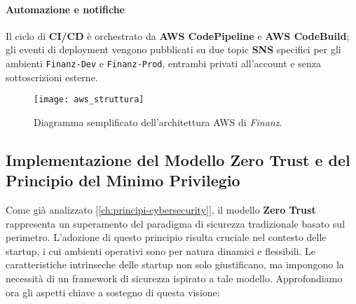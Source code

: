 \paragraph{Automazione e notifiche}
Il ciclo di \textbf{CI/CD} è orchestrato da \textbf{AWS CodePipeline} e \textbf{AWS CodeBuild}; gli eventi di deployment vengono pubblicati su due topic \textbf{SNS} specifici per gli ambienti \texttt{Finanz-Dev} e \texttt{Finanz-Prod}, entrambi privati all’account e senza sottoscrizioni esterne.

\begin{figure}[htbp]
  \centering
  \texttt{[image: aws\_struttura]}
  \caption{Diagramma semplificato dell’architettura AWS di \textit{Finanz}.}
  \label{fig:aws_struttura_attuale_cap2}
\end{figure}


\subsection{Implementazione del Modello Zero Trust e del Principio del Minimo Privilegio}
\label{sec:zero-trust-implementation}

Come già analizzato [\ref{ch:principi-cybersecurity}], il modello \textbf{Zero Trust} rappresenta un superamento del paradigma di sicurezza tradizionale basato sul perimetro. L'adozione di questo principio risulta cruciale nel contesto delle startup, i cui ambienti operativi sono per natura dinamici e flessibili. Le caratteristiche intrinseche delle startup non solo giustificano, ma impongono la necessità di un framework di sicurezza ispirato a tale modello. Approfondiamo ora gli aspetti chiave a sostegno di questa visione:

